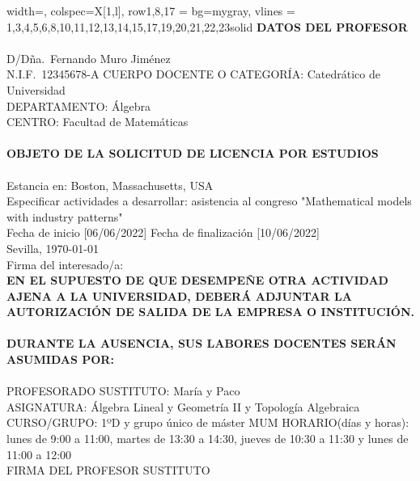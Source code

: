 \documentclass[a4paper,10pt]{article}
\begin{document}
\begin{minipage}{0.7\textwidth}
\begin{longtblr}{width=\textwidth, colspec={X[1,l]}, row{1,8,17} = {bg=mygray}, vlines =
{1,3,4,5,6,8,10,11,12,13,14,15,17,19,20,21,22,23}{solid}}
\hline
\textbf{DATOS DEL PROFESOR} \\
\hline
{} \\[-5mm]
\hline
\small D/Dña.~Fernando Muro Jiménez \\
\small N.I.F.~12345678-A CUERPO DOCENTE O CATEGORÍA: Catedrático de Universidad \\
\small DEPARTAMENTO: Álgebra \\
\small CENTRO: Facultad de Matemáticas \\
\hline
{} \\[-5mm]
\hline
\textbf{OBJETO DE LA SOLICITUD DE LICENCIA POR ESTUDIOS} \\
\hline
{} \\[-5mm]
\hline
Estancia en: Boston, Massachusetts, USA \\
Especificar actividades a desarrollar: asistencia al congreso "Mathematical models with industry patterns" \\
Fecha de inicio [06/06/2022] Fecha de finalización [10/06/2022] \\
\centering Sevilla, \today \\[-2mm]
\centering Firma del interesado/a: \\[10mm]
\textbf{EN EL SUPUESTO DE QUE DESEMPEÑE OTRA ACTIVIDAD AJENA A LA UNIVERSIDAD, DEBERÁ ADJUNTAR LA AUTORIZACIÓN DE SALIDA
DE LA EMPRESA O INSTITUCIÓN.} \\
\hline
{} \\[-5mm]
\hline
\textbf{DURANTE LA AUSENCIA, SUS LABORES DOCENTES SERÁN ASUMIDAS POR:} \\
\hline
{} \\[-5mm]
\hline
\small PROFESORADO SUSTITUTO: María y Paco\\
\small ASIGNATURA: Álgebra Lineal y Geometría II y Topología Algebraica\\
\small CURSO/GRUPO: 1ºD y grupo único de máster MUM HORARIO(días y horas): lunes de 9:00 a 11:00, martes de 13:30 a 14:30, jueves de 10:30 a 11:30 y lunes de 11:00 a 12:00\\
\centering\small FIRMA DEL PROFESOR SUSTITUTO \\[10mm]
\hline
\end{longtblr}
\end{minipage}

\vspace{-3mm}
\end{document}
